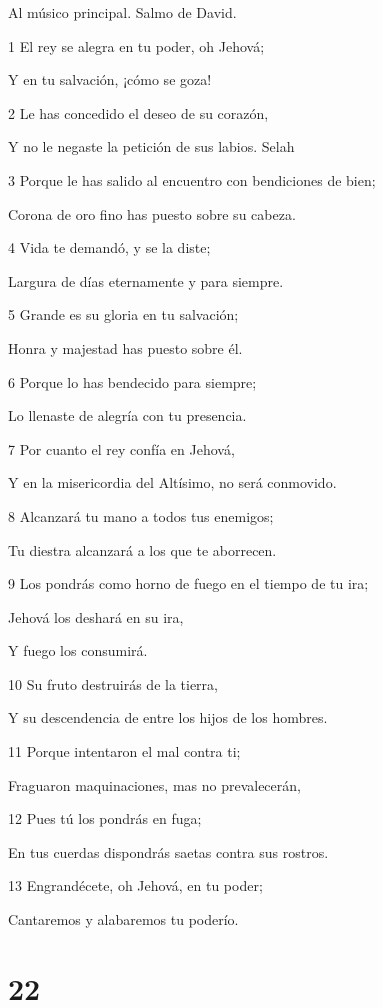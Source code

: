 \par Al músico principal. Salmo de David.

\par 1 El rey se alegra en tu poder, oh Jehová;
\par Y en tu salvación, ¡cómo se goza!
\par 2 Le has concedido el deseo de su corazón,
\par Y no le negaste la petición de sus labios. Selah
\par 3 Porque le has salido al encuentro con bendiciones de bien;
\par Corona de oro fino has puesto sobre su cabeza.
\par 4 Vida te demandó, y se la diste;
\par Largura de días eternamente y para siempre.
\par 5 Grande es su gloria en tu salvación;
\par Honra y majestad has puesto sobre él.
\par 6 Porque lo has bendecido para siempre;
\par Lo llenaste de alegría con tu presencia.
\par 7 Por cuanto el rey confía en Jehová,
\par Y en la misericordia del Altísimo, no será conmovido.
\par 8 Alcanzará tu mano a todos tus enemigos;
\par Tu diestra alcanzará a los que te aborrecen.
\par 9 Los pondrás como horno de fuego en el tiempo de tu ira;
\par Jehová los deshará en su ira,
\par Y fuego los consumirá.
\par 10 Su fruto destruirás de la tierra,
\par Y su descendencia de entre los hijos de los hombres.
\par 11 Porque intentaron el mal contra ti;
\par Fraguaron maquinaciones, mas no prevalecerán,
\par 12 Pues tú los pondrás en fuga;
\par En tus cuerdas dispondrás saetas contra sus rostros.
\par 13 Engrandécete, oh Jehová, en tu poder;
\par Cantaremos y alabaremos tu poderío.

\chapter{22}

